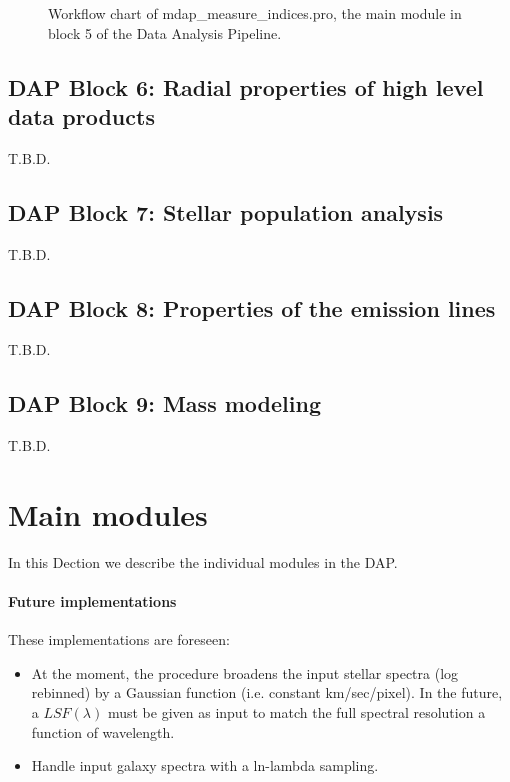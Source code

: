 \documentclass[11pt]{book}
\begin{document}
\begin{figure}
\begin{center}
\caption{Workflow chart of mdap\_measure\_indices.pro, the main module in block 5 of the Data Analysis Pipeline.}
 \label{dap_fig:block5}
\end{center}
\end{figure}



\section{DAP Block 6: Radial properties of high level data products}
T.B.D.

\section{DAP Block 7: Stellar population analysis}
T.B.D.

\section{DAP Block 8: Properties of the emission lines}
T.B.D.

\section{DAP Block 9: Mass modeling}
T.B.D.


\chapter{Main modules}
\label{dap_chap:dap_modules}

In this Dection we describe the individual modules in the DAP.







\subsubsection{Future implementations}

These implementations are foreseen:
\begin{itemize}

\item At the moment, the procedure broadens the input stellar spectra
  (log rebinned) by a Gaussian function (i.e. constant
  km/sec/pixel). In the future, a $LSF(\lambda)$ must be given as
  input to match the full spectral resolution a function of
  wavelength.

\item Handle input galaxy spectra with a ln-lambda sampling. 

\end{itemize}
\end{document}
